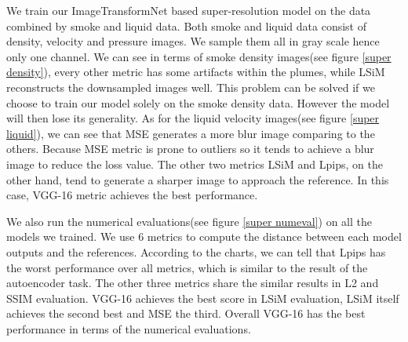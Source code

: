 \documentclass[a4paper,12pt,twoside]{report}
\begin{document}
We train our ImageTransformNet based super-resolution model on the data combined by smoke and liquid data. Both smoke and liquid data consist of density, velocity and pressure images. We sample them all in gray scale hence only one channel.
We can see in terms of smoke density images(see figure \ref{super density}), every other metric has some artifacts within the plumes, while LSiM reconstructs the downsampled images well. This problem can be solved if we choose to train our model solely on the smoke density data. However the model will then lose its generality.
As for the liquid velocity images(see figure \ref{super liquid}), we can see that MSE generates a more blur image comparing to the others. Because MSE metric is prone to outliers so it tends to achieve a blur image to reduce the loss value. The other two metrics LSiM and Lpips, on the other hand, tend to generate a sharper image to approach the reference. In this case, VGG-16 metric achieves the best performance.

We also run the numerical evaluations(see figure \ref{super numeval}) on all the models we trained. We use 6 metrics to compute the distance between each model outputs and the references. According to the charts, we can tell that Lpips has the worst performance over all metrics, which is similar to the result of the autoencoder task. The other three metrics share the similar results in L2 and SSIM evaluation. VGG-16 achieves the best score in LSiM evaluation, LSiM itself achieves the second best and MSE the third. Overall VGG-16 has the best performance in terms of the numerical evaluations.
\end{document}
